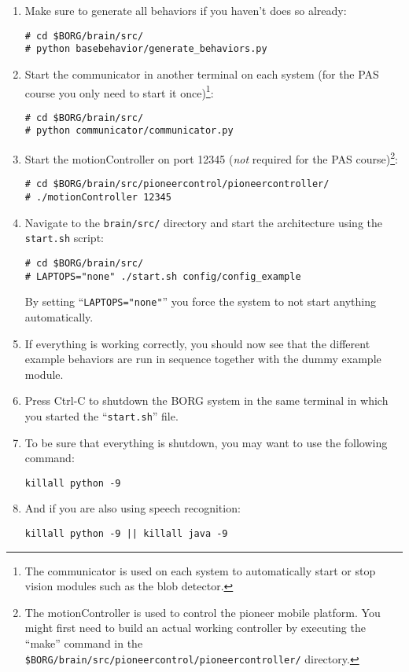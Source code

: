 \documentclass[a4paper, 10pt]{article}
\begin{document}
\begin{enumerate}
    \item Make sure to generate all behaviors if you haven't does so already:
\begin{lstlisting}
# cd $BORG/brain/src/
# python basebehavior/generate_behaviors.py
\end{lstlisting}
    \item Start the communicator in another terminal on each system (for the PAS course you only need to start it once)\footnote{The communicator is used on each system to automatically start or stop vision modules such as the blob detector.}:
\begin{lstlisting}
# cd $BORG/brain/src/
# python communicator/communicator.py
\end{lstlisting}
    \item Start the motionController on port 12345 (\textit{not} required for the PAS course)\footnote{The motionController is used to control the pioneer mobile platform. You might first need to build an actual working controller by executing the ``make'' command in the \lstinline{$BORG/brain/src/pioneercontrol/pioneercontroller/} directory.}:
\begin{lstlisting}
# cd $BORG/brain/src/pioneercontrol/pioneercontroller/
# ./motionController 12345
\end{lstlisting}
    \item Navigate to the \lstinline{brain/src/} directory and start the architecture using the \lstinline{start.sh} script:
\begin{lstlisting}
# cd $BORG/brain/src/
# LAPTOPS="none" ./start.sh config/config_example
\end{lstlisting}
        By setting ``\lstinline{LAPTOPS="none"}'' you force the system to not start anything automatically.
    \item If everything is working correctly, you should now see that the different example behaviors are run in sequence together with the dummy example module.
    \item Press Ctrl-C to shutdown the BORG system in the same terminal in which you started the ``\lstinline{start.sh}'' file.
    \item To be sure that everything is shutdown, you may want to use the following command:
\begin{lstlisting}
killall python -9
\end{lstlisting}
    \item And if you are also using speech recognition:
\begin{lstlisting}
killall python -9 || killall java -9
\end{lstlisting}
\end{enumerate}
\end{document}
